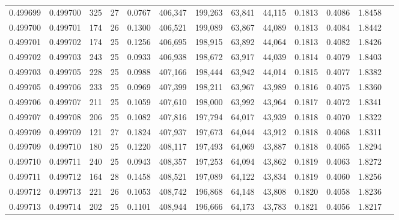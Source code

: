 \begin{tabular}{rrrrrrrrrrrrr}
0.499699 & 0.499700 & 325 &  27 &                                     0.0767 & 406,347 & 199,263 &  63,841 &  44,115 & 0.1813 & 0.4086 & 1.8458 \\
0.499700 & 0.499701 & 174 &  26 &                                     0.1300 & 406,521 & 199,089 &  63,867 &  44,089 & 0.1813 & 0.4084 & 1.8442 \\
0.499701 & 0.499702 & 174 &  25 &                                     0.1256 & 406,695 & 198,915 &  63,892 &  44,064 & 0.1813 & 0.4082 & 1.8426 \\
0.499702 & 0.499703 & 243 &  25 &                                     0.0933 & 406,938 & 198,672 &  63,917 &  44,039 & 0.1814 & 0.4079 & 1.8403 \\
0.499703 & 0.499705 & 228 &  25 &                                     0.0988 & 407,166 & 198,444 &  63,942 &  44,014 & 0.1815 & 0.4077 & 1.8382 \\
0.499705 & 0.499706 & 233 &  25 &                                     0.0969 & 407,399 & 198,211 &  63,967 &  43,989 & 0.1816 & 0.4075 & 1.8360 \\
0.499706 & 0.499707 & 211 &  25 &                                     0.1059 & 407,610 & 198,000 &  63,992 &  43,964 & 0.1817 & 0.4072 & 1.8341 \\
0.499707 & 0.499708 & 206 &  25 &                                     0.1082 & 407,816 & 197,794 &  64,017 &  43,939 & 0.1818 & 0.4070 & 1.8322 \\
0.499709 & 0.499709 & 121 &  27 &                                     0.1824 & 407,937 & 197,673 &  64,044 &  43,912 & 0.1818 & 0.4068 & 1.8311 \\
0.499709 & 0.499710 & 180 &  25 &                                     0.1220 & 408,117 & 197,493 &  64,069 &  43,887 & 0.1818 & 0.4065 & 1.8294 \\
0.499710 & 0.499711 & 240 &  25 &                                     0.0943 & 408,357 & 197,253 &  64,094 &  43,862 & 0.1819 & 0.4063 & 1.8272 \\
0.499711 & 0.499712 & 164 &  28 &                                     0.1458 & 408,521 & 197,089 &  64,122 &  43,834 & 0.1819 & 0.4060 & 1.8256 \\
0.499712 & 0.499713 & 221 &  26 &                                     0.1053 & 408,742 & 196,868 &  64,148 &  43,808 & 0.1820 & 0.4058 & 1.8236 \\
0.499713 & 0.499714 & 202 &  25 &                                     0.1101 & 408,944 & 196,666 &  64,173 &  43,783 & 0.1821 & 0.4056 & 1.8217 \\

\end{tabular}
